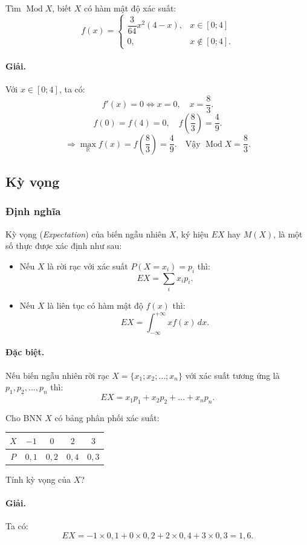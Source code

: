 \begin{vidu}[VD 3]
Tìm $\operatorname{Mod} X$, biết $X$ có hàm mật độ xác suất:
\[
f(x) = \begin{cases}
\dfrac{3}{64} x^2 (4 - x), & x \in [0; 4] \\
0, & x \notin [0; 4].
\end{cases}
\]

\paragraph{Giải.} Với $x \in [0; 4]$, ta có:
\[
f'(x) = 0 \Leftrightarrow x = 0, \quad x = \frac{8}{3}.
\]
\[
f(0) = f(4) = 0, \quad f\left(\frac{8}{3}\right) = \frac{4}{9}.
\]
\[
\Rightarrow \max_{\mathbb{R}} f(x) = f\left(\frac{8}{3}\right) = \frac{4}{9}. \quad \text{Vậy } \operatorname{Mod} X = \frac{8}{3}.
\]
\end{vidu}

\subsection{Kỳ vọng}

\subsubsection{Định nghĩa}
Kỳ vọng (\textit{Expectation}) của biến ngẫu nhiên $X$, ký hiệu $EX$ hay $M(X)$, là một số thực được xác định như sau:
\begin{itemize}
    \item Nếu $X$ là rời rạc với xác suất $P(X = x_i) = p_i$ thì:
    \[
    EX = \sum_i x_i p_i.
    \]
    \item Nếu $X$ là liên tục có hàm mật độ $f(x)$ thì:
    \[
    EX = \int_{-\infty}^{+\infty} x f(x)\,dx.
    \]
\end{itemize}

\paragraph{Đặc biệt.} Nếu biến ngẫu nhiên rời rạc $X = \{x_1; x_2; \dots; x_n\}$ với xác suất tương ứng là $p_1, p_2, \dots, p_n$ thì:
\[
EX = x_1 p_1 + x_2 p_2 + \dots + x_n p_n.
\]

\begin{vidu}[VD 4]
Cho BNN $X$ có bảng phân phối xác suất:
\begin{center}
\begin{tabular}{|c|c|c|c|c|}
\hline
$X$ & $-1$ & $0$ & $2$ & $3$ \\
\hline
$P$ & $0{,}1$ & $0{,}2$ & $0{,}4$ & $0{,}3$ \\
\hline
\end{tabular}
\end{center}
Tính kỳ vọng của $X$?

\paragraph{Giải.} Ta có:
\[
EX = -1 \times 0{,}1 + 0 \times 0{,}2 + 2 \times 0{,}4 + 3 \times 0{,}3 = 1{,}6.
\]
\end{vidu}

